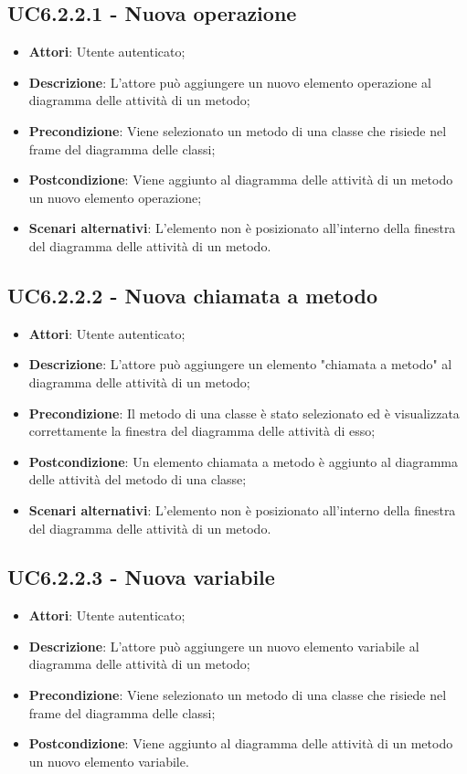 \subsection{UC6.2.2.1 - Nuova operazione} 
\label{ssec:UC6.2.2.1} 
\begin{itemize} 
\item \textbf{Attori}: Utente autenticato;
\item \textbf{Descrizione}: L'attore può aggiungere un nuovo elemento operazione al diagramma delle attività di un metodo;
\item \textbf{Precondizione}: Viene selezionato un metodo di una classe che risiede nel frame del diagramma delle  classi;
\item \textbf{Postcondizione}: Viene aggiunto al diagramma delle attività di un metodo un nuovo elemento operazione;
\item \textbf{Scenari alternativi}: L'elemento non è posizionato all'interno della finestra del diagramma delle attività di un metodo.
\end{itemize} 
\subsection{UC6.2.2.2 - Nuova chiamata a metodo} 
\label{ssec:UC6.2.2.2} 
\begin{itemize} 
\item \textbf{Attori}: Utente autenticato;
\item \textbf{Descrizione}: L'attore può aggiungere un elemento "chiamata a metodo" al diagramma delle attività di un metodo;
\item \textbf{Precondizione}: Il metodo di una classe è stato selezionato ed è visualizzata correttamente la finestra del diagramma delle attività di esso;
\item \textbf{Postcondizione}: Un elemento chiamata a metodo è aggiunto al diagramma delle attività del metodo di una classe;
\item \textbf{Scenari alternativi}: L'elemento non è posizionato all'interno della finestra del diagramma delle attività di un metodo.
\end{itemize} 
\subsection{UC6.2.2.3 - Nuova variabile} 
\label{ssec:UC6.2.2.3} 
\begin{itemize} 
\item \textbf{Attori}: Utente autenticato;
\item \textbf{Descrizione}: L'attore può aggiungere un nuovo elemento variabile al diagramma delle attività di un metodo;
\item \textbf{Precondizione}: Viene selezionato un metodo di una classe che risiede nel frame del diagramma delle  classi;
\item \textbf{Postcondizione}: Viene aggiunto al diagramma delle attività di un metodo un nuovo elemento variabile.
\end{itemize} 

